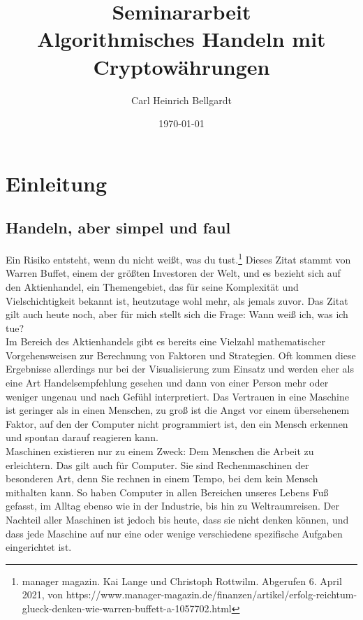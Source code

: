 \documentclass[12pt]{article}
\begin{document}
\begin{titlepage}	
	\title{\LARGE Seminararbeit\\ \large Algorithmisches Handeln mit Cryptowährungen}
	\date{\small \today}
	\author{\small Carl Heinrich Bellgardt}	
	\clearpage\maketitle
	\thispagestyle{empty}
\end{titlepage}

\setcounter{page}{2}
\tableofcontents
\pagebreak
\section{Einleitung}
\subsection{Handeln, aber simpel und faul}
	\glqq Ein Risiko entsteht, wenn du nicht weißt, was du tust.\grqq{}\footnote{manager magazin. Kai Lange und Christoph Rottwilm. Abgerufen 6. April 2021, von https://www.manager-magazin.de/finanzen/artikel/erfolg-reichtum-glueck-denken-wie-warren-buffett-a-1057702.html} Dieses Zitat stammt von Warren Buffet, einem der größten Investoren der Welt, und es bezieht sich auf den Aktienhandel, ein Themengebiet, das für seine Komplexität und Vielschichtigkeit bekannt ist, heutzutage wohl mehr, als jemals zuvor. Das Zitat gilt auch heute noch, aber für mich stellt sich die Frage: Wann weiß ich, was ich tue?\\
	Im Bereich des Aktienhandels gibt es bereits eine Vielzahl mathematischer Vorgehensweisen zur Berechnung von Faktoren und Strategien. Oft kommen diese Ergebnisse allerdings nur bei der Visualisierung zum Einsatz und werden eher als eine Art Handelsempfehlung gesehen und dann von einer Person mehr oder weniger ungenau und nach Gefühl interpretiert. Das Vertrauen in eine Maschine ist geringer als in einen Menschen, zu groß ist die Angst vor einem übersehenem Faktor, auf den der Computer nicht programmiert ist, den ein Mensch erkennen und spontan darauf reagieren kann.\\
	Maschinen existieren nur zu einem Zweck: Dem Menschen die Arbeit zu erleichtern. Das gilt auch für Computer. Sie sind Rechenmaschinen der besonderen Art, denn Sie rechnen in einem Tempo, bei dem kein Mensch mithalten kann. So haben Computer in allen Bereichen unseres Lebens Fuß gefasst, im Alltag ebenso wie in der Industrie, bis hin zu Weltraumreisen. Der Nachteil aller Maschinen ist jedoch bis heute, dass sie nicht denken können, und dass jede Maschine auf nur eine oder wenige verschiedene spezifische Aufgaben eingerichtet ist.\\
\end{document}
